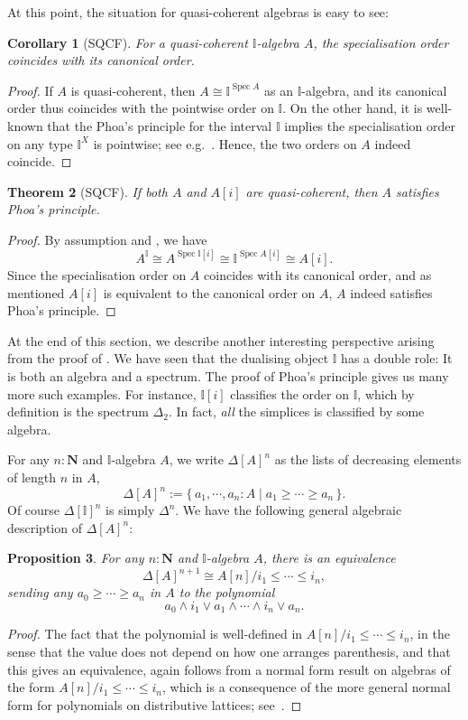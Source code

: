\documentclass[12pt]{amsart}
\newtheorem{theorem}{Theorem}[section]
\newtheorem{corollary}[theorem]{Corollary}
\newtheorem{proposition}[theorem]{Proposition}
\theoremstyle{definition}
\newcommand{\mb}[1]{\mathbf{#1}}
\newcommand{\mbb}[1]{\mathbb{#1}}
\newcommand{\I}{\mbb I}
\newcommand{\scomp}[2]{\{\,#1\mid#2\,\}}
\newcommand{\N}{\mb N}
\newcommand{\spec}{\operatorname{Spec}}
\begin{document}
At this point, the situation for quasi-coherent algebras is easy to see:

\begin{corollary}[SQCF]
  For a quasi-coherent $\I$-algebra $A$, the specialisation order coincides with its canonical order.
\end{corollary}
\begin{proof}
  If $A$ is quasi-coherent, then $A \cong \I^{\spec A}$ as an $\I$-algebra, and its canonical order thus coincides with the pointwise order on $\I$. On the other hand, it is well-known that the Phoa's principle for the interval $\I$ implies the specialisation order on any type $\I^X$ is pointwise; see e.g.~\cite[Thm. 4.2.1]{hyland2006first}. Hence, the two orders on $A$ indeed coincide.
\end{proof}

\begin{theorem}[SQCF]\label{thm:algebraphoa}
  If both $A$ and $A[i]$ are quasi-coherent, then $A$ satisfies Phoa's principle.
\end{theorem}
\begin{proof}
  By assumption and , we have
  \[ A^\I \cong A^{\spec \I[i]} \cong \I^{\spec A[i]} \cong A[i]. \]
  Since the specialisation order on $A$ coincides with its canonical order, and as mentioned $A[i]$ is equivalent to the canonical order on $A$, $A$ indeed satisfies Phoa's principle.
\end{proof}

At the end of this section, we describe another interesting perspective arising from the proof of . We have seen that the dualising object $\I$ has a double role: It is both an algebra and a spectrum. The proof of Phoa's principle gives us many more such examples. For instance, $\I[i]$ classifies the order on $\I$, which by definition is the spectrum $\Delta_2$. In fact, \emph{all} the simplices is classified by some algebra.

For any $n : \N$ and $\I$-algebra $A$, we write $\Delta[A]^{n}$ as the lists of decreasing elements of length $n$ in $A$,
\[ \Delta[A]^{n} := \scomp{a_1,\cdots,a_n : A}{a_1 \ge \cdots \ge a_n}. \]
Of course $\Delta[\I]^n$ is simply $\Delta^n$. We have the following general algebraic description of $\Delta[A]^n$:

\begin{proposition}\label{prop:simplicesasalgebra}
  For any $n : \N$ and $\I$-algebra $A$, there is an equivalence 
  \[ \Delta[A]^{n+1} \cong A[n]/i_1 \le \cdots \le i_n, \]
  sending any $a_0 \ge \cdots \ge a_n$ in $A$ to the polynomial 
  \[ a_0 \wedge i_1 \vee a_1 \wedge \cdots \wedge i_n \vee a_n. \]
\end{proposition}
\begin{proof}
  The fact that the polynomial is well-defined in $A[n]/i_1 \le \cdots \le i_n$, in the sense that the value does not depend on how one arranges parenthesis, and that this gives an equivalence, again follows from a normal form result on algebras of the form $A[n]/i_1 \le \cdots \le i_n$, which is a consequence of the more general normal form for polynomials on distributive lattices; see~\cite[Thm. 10.21]{lausch2000algebra}.
\end{proof}
\end{document}
